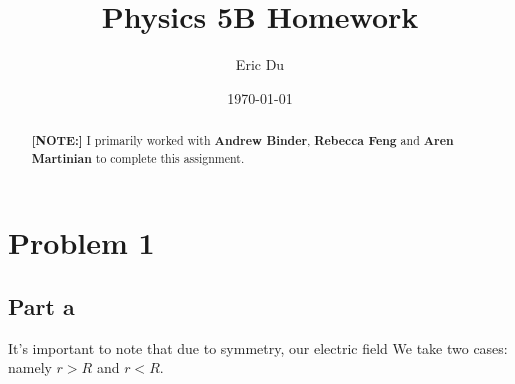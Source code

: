 \documentclass{article}
\title{Physics 5B Homework}
\author{Eric Du}
\date{\today}
\theoremstyle{definition}
\numberwithin{equation}{section}
\numberwithin{definition}{section}
\begin{document}
\maketitle
\begin{abstract}
    \noindent \textbf{[NOTE:]} I primarily worked with \textbf{Andrew Binder}, \textbf{Rebecca Feng} and \textbf{Aren Martinian} to complete this assignment.
\end{abstract}


\section{Problem 1}

\subsection{Part a}
It's important to note that due to symmetry, our electric field 
We take two cases: namely $r > R$ and $r < R$.
\end{document}

